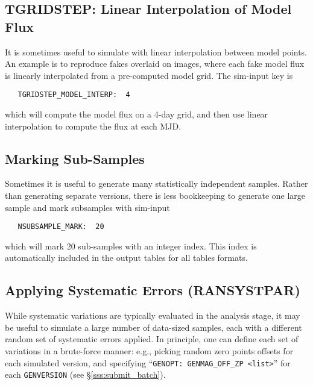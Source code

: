 \documentclass[12pt]{article}
\begin{document}
   \clearpage
   \subsection{TGRIDSTEP: Linear Interpolation of Model Flux}
   \label{ssec:TGRIDSTEP}

It is sometimes useful to simulate with linear interpolation
between model points. An example is to reproduce fakes overlaid
on images, where each fake model flux is linearly interpolated
from a pre-computed model grid.  The sim-input key is
%
\begin{verbatim}
   TGRIDSTEP_MODEL_INTERP:  4  
\end{verbatim}
% 
which will compute the model flux on a 4-day grid,
and then use linear interpolation to compute the flux
at each MJD.

   \subsection{Marking Sub-Samples}
   \label{ssec:subsamples}

Sometimes it is useful to generate many statistically independent 
samples. Rather than generating separate versions, there is less
bookkeeping to generate one large sample and mark subsamples with
sim-input
\begin{verbatim}
   NSUBSAMPLE_MARK:  20
\end{verbatim}
%
which will mark 20 sub-samples with an integer index.
This index is automatically included in the output tables
for all tables formats.


  \clearpage
   \subsection{Applying Systematic Errors (RANSYSTPAR) }
   \label{ssec:RANSYSTPAR}

While systematic variations are typically evaluated in the analysis stage,
it may be useful to simulate a large number of data-sized samples,
each with a different random set of systematic errors applied.
In principle, one can define each set of variations in a brute-force manner:
e.g., picking random zero points offsets for each simulated version,
and specifying ``{\tt GENOPT: GENMAG\_OFF\_ZP <list>}'' for each
{\tt GENVERSION} (see \S\ref{sss:submit_batch}).
\end{document}
